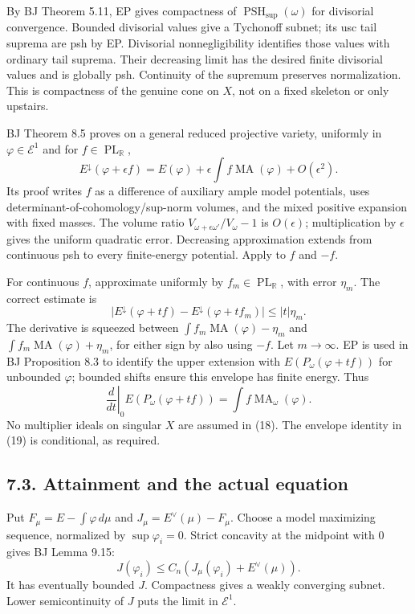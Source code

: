 \documentclass[
  11pt,
]{article}
\begin{document}
By BJ Theorem 5.11, EP gives compactness of
\(\operatorname{PSH}_{\sup}(\omega)\) for divisorial convergence.
Bounded divisorial values give a Tychonoff subnet; its usc tail suprema
are psh by EP. Divisorial nonnegligibility identifies those values with
ordinary tail suprema. Their decreasing limit has the desired finite
divisorial values and is globally psh. Continuity of the supremum
preserves normalization. This is compactness of the genuine cone on
\(X\), not on a fixed skeleton or only upstairs.

BJ Theorem 8.5 proves on a general reduced projective variety, uniformly
in \(\varphi\in\mathcal E^1\) and for
\(f\in\operatorname{PL}_{\mathbb R}\),
\[E^\downarrow(\varphi+\epsilon f)
 =E(\varphi)+\epsilon\int f\operatorname{MA}(\varphi)+O(\epsilon^2).\tag{18}\]
Its proof writes \(f\) as a difference of auxiliary ample model
potentials, uses determinant-of-cohomology/sup-norm volumes, and the
mixed positive expansion with fixed masses. The volume ratio
\(V_{\omega+\epsilon\omega'}/V_\omega-1\) is \(O(\epsilon)\);
multiplication by \(\epsilon\) gives the uniform quadratic error.
Decreasing approximation extends from continuous psh to every
finite-energy potential. Apply to \(f\) and \(-f\).

For continuous \(f\), approximate uniformly by
\(f_m\in\operatorname{PL}_{\mathbb R}\), with error \(\eta_m\). The
correct estimate is
\[|E^\downarrow(\varphi+tf)-E^\downarrow(\varphi+tf_m)|\leq|t|\eta_m.\]
The derivative is squeezed between
\(\int f_m\operatorname{MA}(\varphi)-\eta_m\) and
\(\int f_m\operatorname{MA}(\varphi)+\eta_m\), for either sign by also
using \(-f\). Let \(m\to\infty\). EP is used in BJ Proposition 8.3 to
identify the upper extension with \(E(P_\omega(\varphi+tf))\) for
unbounded \(\varphi\); bounded shifts ensure this envelope has finite
energy. Thus \[\left.\frac d{dt}\right|_{0}E(P_\omega(\varphi+tf))
       =\int f\operatorname{MA}_\omega(\varphi).\tag{19}\] No multiplier
ideals on singular \(X\) are assumed in (18). The envelope identity in
(19) is conditional, as required.

\subsection{7.3. Attainment and the actual
equation}\label{attainment-and-the-actual-equation}

Put \(F_\mu=E-\int\varphi\,d\mu\) and \(J_\mu=E^\vee(\mu)-F_\mu\).
Choose a model maximizing sequence, normalized by \(\sup\varphi_i=0\).
Strict concavity at the midpoint with \(0\) gives BJ Lemma 9.15:
\[J(\varphi_i)\leq C_n(J_\mu(\varphi_i)+E^\vee(\mu)).\] It has
eventually bounded \(J\). Compactness gives a weakly converging subnet.
Lower semicontinuity of \(J\) puts the limit in \(\mathcal E^1\).
\end{document}
